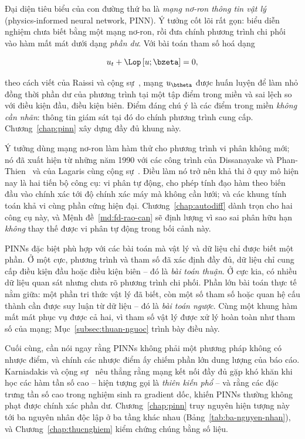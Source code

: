 Đại diện tiêu biểu của con đường thứ ba là \emph{mạng nơ-ron thông tin vật lý}
(physics-informed neural network, PINN). Ý tưởng cốt lõi rất gọn: biểu diễn nghiệm
chưa biết bằng một mạng nơ-ron, rồi đưa chính phương trình chi phối vào hàm mất
mát dưới dạng \emph{phần dư}. Với bài toán tham số hoá dạng

\begin{equation*}
    u_t + \Lop\left[u; \bzeta\right] = 0,
\end{equation*}

theo cách viết của Raissi và cộng sự~\cite{raissi2019}, mạng $u_{\btheta}$ được
huấn luyện để làm nhỏ đồng thời phần dư của phương trình tại một tập điểm trong
miền và sai lệch so với điều kiện đầu, điều kiện biên. Điểm đáng chú ý là các
điểm trong miền \emph{không cần nhãn}: thông tin giám sát tại đó do chính phương
trình cung cấp. Chương~\ref{chap:pinn} xây dựng đầy đủ khung này.
 
Ý tưởng dùng mạng nơ-ron làm hàm thử cho phương trình vi phân không mới; nó đã
xuất hiện từ những năm 1990 với các công trình của Dissanayake và
Phan-Thien~\cite{dissanayake1994} và của Lagaris cùng cộng sự~\cite{lagaris1998}.
Điều làm nó trở nên khả thi ở quy mô hiện nay là hai tiến bộ công cụ: vi phân tự
động, cho phép tính đạo hàm theo biến đầu vào chính xác tới độ chính xác máy mà
không cần lưới; và các khung tính toán khả vi cùng phần cứng hiện đại.
Chương~\ref{chap:autodiff} dành trọn cho hai công cụ này, và
Mệnh đề~\ref{md:fd-rao-can} sẽ định lượng vì sao sai phân hữu hạn \emph{không}
thay thế được vi phân tự động trong bối cảnh này.
 
PINNs đặc biệt phù hợp với các bài toán mà vật lý và dữ liệu chỉ được biết một
phần. Ở một cực, phương trình và tham số đã xác định đầy đủ, dữ liệu chỉ cung cấp
điều kiện đầu hoặc điều kiện biên -- đó là \emph{bài toán thuận}. Ở cực kia, có
nhiều dữ liệu quan sát nhưng chưa rõ phương trình chi phối. Phần lớn bài toán thực
tế nằm giữa: một phần tri thức vật lý đã biết, còn một số tham số hoặc quan hệ cấu
thành cần được suy luận từ dữ liệu -- đó là \emph{bài toán ngược}. Cùng một khung
hàm mất mát phục vụ được cả hai, vì tham số vật lý được xử lý hoàn toàn như tham
số của mạng; Mục~\ref{subsec:thuan-nguoc} trình bày điều này.
 
Cuối cùng, cần nói ngay rằng PINNs không phải một phương pháp không có nhược điểm,
và chính các nhược điểm ấy chiếm phần lớn dung lượng của báo cáo. Karniadakis và
cộng sự~\cite{karniadakis2021} nêu thẳng rằng mạng kết nối đầy đủ gặp khó khăn khi
học các hàm tần số cao -- hiện tượng gọi là \emph{thiên kiến phổ} -- và rằng các
đặc trưng tần số cao trong nghiệm sinh ra gradient dốc, khiến PINNs thường không
phạt được chính xác phần dư. Chương~\ref{chap:pinn} truy nguyên hiện tượng này tới
ba nguyên nhân độc lập ở ba tầng khác nhau (Bảng~\ref{tab:ba-nguyen-nhan}), và
Chương~\ref{chap:thucnghiem} kiểm chứng chúng bằng số liệu.
 
